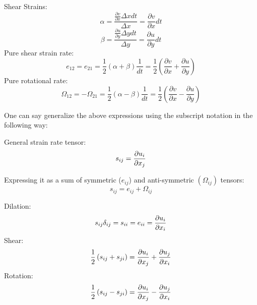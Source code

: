 Shear Strains:
$$\alpha = \frac{\frac{\partial v}{\partial x} \Delta x dt}{\Delta x} = \frac{\partial v}{\partial x} dt$$
$$\beta = \frac{\frac{\partial u}{\partial y} \Delta y dt}{\Delta y} = \frac{\partial u}{\partial y} dt$$
Pure shear strain rate:
$$e_{12} = e_{21} = \frac{1}{2} (\alpha + \beta) \frac{1}{dt} = \frac{1}{2} \left( \frac{\partial v}{\partial x} + \frac{\partial u}{\partial y} \right) $$
Pure rotational rate:
$$\Omega_{12} = -\Omega_{21} = \frac{1}{2} (\alpha - \beta) \frac{1}{dt} = \frac{1}{2} \left( \frac{\partial v}{\partial x} - \frac{\partial u}{\partial y} \right) $$

One can say generalize the above expressions using the subscript notation in the following way:

General strain rate tensor: $$ s_{ij} = {\partial u_i \over \partial x_j}$$

Expressing it as a sum of symmetric ($e_{ij}$) and anti-symmetric $(\Omega_{ij})$ tensors:
$$ s_{ij} = e_{ij} + \Omega_{ij}$$
	
Dilation: $$s_{ij} \delta_{ij} = s_{ii} = e_{ii} = {\partial u_i \over \partial x_i}$$ 
Shear: $${1 \over 2} \left( s_{ij} + s_{ji} \right) = {\partial u_i \over \partial x_j} + {\partial u_j \over \partial x_i}$$
Rotation: $${1 \over 2} \left( s_{ij} - s_{ji} \right) = {\partial u_i \over \partial x_j} - {\partial u_j \over \partial x_i}$$

